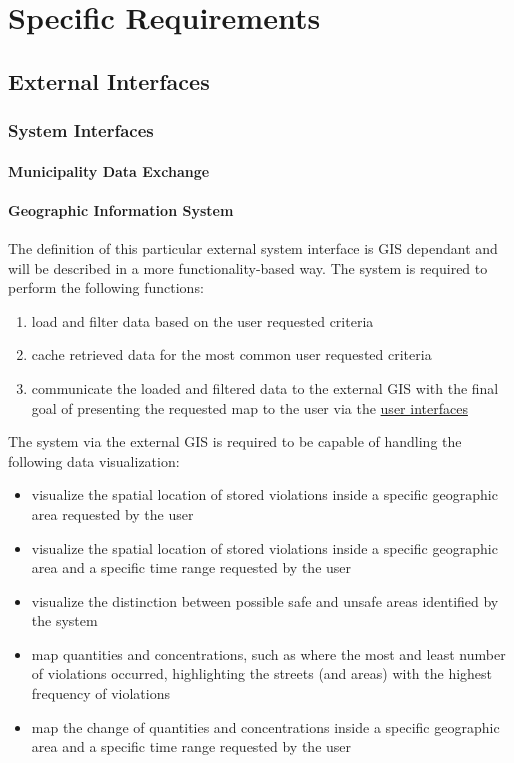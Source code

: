 \section{Specific Requirements}

\subsection{External Interfaces}

\subsubsection{System Interfaces}

\paragraph{Municipality Data Exchange}

\clearpage

\paragraph{Geographic Information System} The definition of this particular external system interface is GIS dependant and will be described in a more functionality-based way. The system is required to perform the following functions:

	\begin{enumerate}[label=\textbf{\arabic*.}]
		\item load and filter data based on the user requested criteria
		\item cache retrieved data for the most common user requested criteria
		\item communicate the loaded and filtered data to the external GIS with the final goal of presenting the requested map to the user via the \hyperref[sec:3userinterface]{user interfaces}
	\end{enumerate}
	
	The system via the external GIS is required to be capable of handling the following data visualization:
	
	\begin{itemize}
		\item visualize the spatial location of stored violations inside a specific geographic area requested by the user
		\item visualize the spatial location of stored violations inside a specific geographic area and a specific time range requested by the user
		\item visualize the distinction between possible safe and unsafe areas identified by the system
		\item map quantities and concentrations, such as where the most and least number of violations occurred, highlighting the streets (and areas) with the highest frequency of violations
		\item map the change of quantities and concentrations inside a specific geographic area and a specific time range requested by the user
	\end{itemize}

